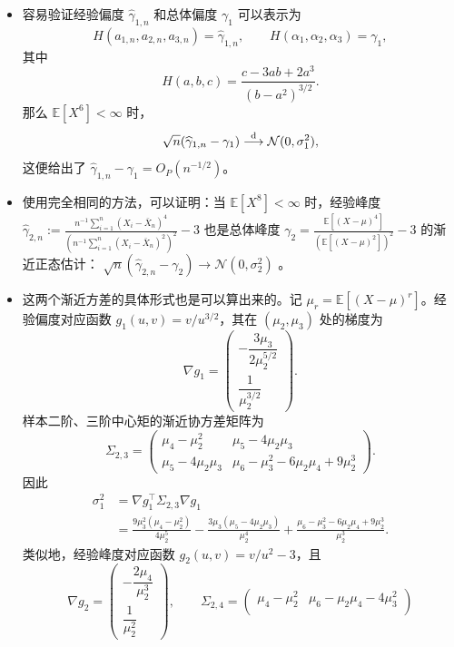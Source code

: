 \begin{corollary*}

\begin{itemize}
\tightlist
\item
  容易验证经验偏度 $\widehat \gamma_{1,n}$ 和总体偏度 $\gamma_1$ 可以表示为
  \[
  H(a_{1,n},a_{2,n},a_{3,n})=\widehat\gamma_{1,n},\qquad
  H(\alpha_1,\alpha_2,\alpha_3)=\gamma_1,
  \]
  其中
  \[
  H(a,b,c)=\frac{c-3ab+2a^3}{(b-a^2)^{3/2}}.
  \]
  那么 $\mathbb E[X^6]<\infty$ 时，
  \[
  \sqrt n(\widehat \gamma_{1,n}-\gamma_1)
  \overset{\rm d}\longrightarrow\mathcal N(0,\sigma_1^2),
  \]
  这便给出了 $\widehat \gamma_{1,n}-\gamma_1=O_P(n^{-1/2})$。
\item
  使用完全相同的方法，可以证明：当 $\mathbb E[X^8]<\infty$ 时，经验峰度 $\textstyle\widehat \gamma_{2,n}:=\frac{ n^{-1}\sum_{i=1}^n (X_i-\bar{X}_n)^4 }{ \left( n^{-1}\sum_{i=1}^n (X_i-\bar{X}_n)^2 \right)^2 } - 3$ 也是总体峰度 $\textstyle\gamma_2=\frac{\mathbb E[(X-\mu)^4]}{(\mathbb E[(X-\mu)^2])^2}-3$ 的渐近正态估计： $\sqrt n(\widehat \gamma_{2,n}-\gamma_2)\to\mathcal N(0,\sigma_2^2)$ 。
\item
  这两个渐近方差的具体形式也是可以算出来的。记
  $\mu_r=\mathbb E[(X-\mu)^r]$。经验偏度对应函数
  $g_1(u,v)=v/u^{3/2}$，其在 $(\mu_2,\mu_3)$ 处的梯度为
  \[
  \nabla g_1=
  \begin{pmatrix}
  -\dfrac{3\mu_3}{2\mu_2^{5/2}}\\[4pt]
  \dfrac1{\mu_2^{3/2}}
  \end{pmatrix}.
  \]
  样本二阶、三阶中心矩的渐近协方差矩阵为
  \[
  \Sigma_{2,3}=
  \begin{pmatrix}
  \mu_4-\mu_2^2 & \mu_5-4\mu_2\mu_3\\
  \mu_5-4\mu_2\mu_3 &
  \mu_6-\mu_3^2-6\mu_2\mu_4+9\mu_2^3
  \end{pmatrix}.
  \]
  因此
  \[
  \begin{aligned}
  \sigma_1^2
  &=\nabla g_1^{\top}\Sigma_{2,3}\nabla g_1\\
  &=\frac{9\mu_3^2(\mu_4-\mu_2^2)}{4\mu_2^5}
   -\frac{3\mu_3(\mu_5-4\mu_2\mu_3)}{\mu_2^4}
   +\frac{\mu_6-\mu_3^2-6\mu_2\mu_4+9\mu_2^3}{\mu_2^3}.
  \end{aligned}
  \]
  类似地，经验峰度对应函数 $g_2(u,v)=v/u^2-3$，且
  \[
  \nabla g_2=
  \begin{pmatrix}
  -\dfrac{2\mu_4}{\mu_2^3}\\[4pt]
  \dfrac1{\mu_2^2}
  \end{pmatrix},\qquad
  \Sigma_{2,4}=
  \begin{pmatrix}
  \mu_4-\mu_2^2 & \mu_6-\mu_2\mu_4-4\mu_3^2\\

\end{pmatrix}\]
\end{itemize}
\end{corollary*}
